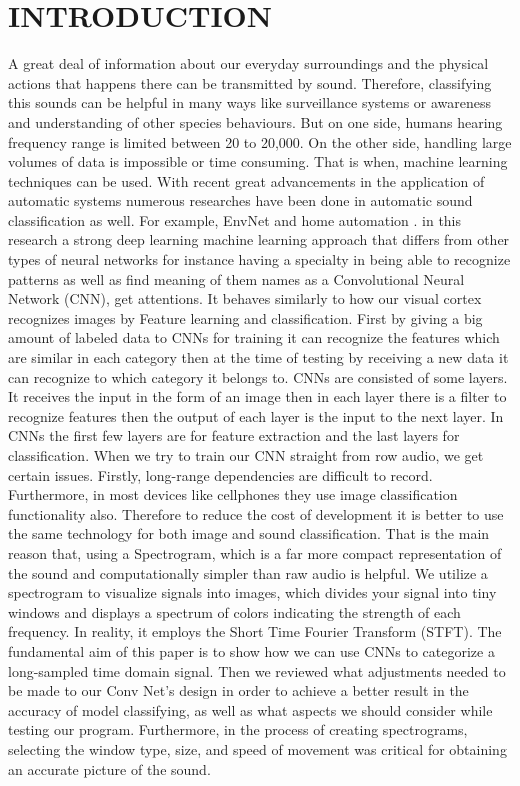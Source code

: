 \documentclass[conference]{IEEEtran}
\begin{document}
\section{INTRODUCTION}
A great deal of information about our everyday surroundings and the physical actions that happens there can be transmitted by sound. Therefore, classifying this sounds can be helpful in many ways like surveillance systems or awareness and understanding of other species behaviours. But on one side, humans hearing frequency range is limited between 20 to 20,000. On the other side, handling large volumes of data is impossible or time consuming. That is when, machine learning techniques can be used. With recent great advancements in the application of automatic systems numerous researches have been done in automatic sound classification as well. For example, EnvNet \cite{b1} and home automation \cite{b2}. in this research a strong deep learning machine learning approach that differs from other types of neural networks for instance having a specialty in being able to recognize patterns as well as find meaning of them names as a Convolutional Neural Network (CNN), get attentions. It behaves similarly to how our visual cortex recognizes images by Feature learning and classification. First by giving a big amount of labeled data to CNNs for training it can recognize the features which are similar in each category then at the time of testing by receiving a new data it can recognize to which category it belongs to. CNNs are consisted of some layers. It receives the input in the form of an image then in each layer there is a filter to recognize features then the output of each layer is the input to the next layer. In CNNs the first few layers are for feature extraction and the last layers for classification. 
When we try to train our CNN straight from row audio, we get certain issues. Firstly, long-range dependencies are difficult to record. Furthermore, in most devices like cellphones they use image classification functionality also. Therefore to reduce the cost of development it is better to use the same technology for both image and sound classification. That is the main reason that, using a Spectrogram, which is a far more compact representation of the sound and computationally simpler than raw audio is helpful. We utilize a spectrogram to visualize signals into images, which divides your signal into tiny windows and displays a spectrum of colors indicating the strength of each frequency. In reality, it employs the Short Time Fourier Transform (STFT). The fundamental aim of this paper is to show how we can use CNNs to categorize a long-sampled time domain signal. Then we reviewed what adjustments needed to be made to our Conv Net's design in order to achieve a better result in the accuracy of model classifying, as well as what aspects we should consider while testing our program. Furthermore, in the process of creating spectrograms, selecting the window type, size, and speed of movement was critical for obtaining an accurate picture of the sound.
\end{document}
